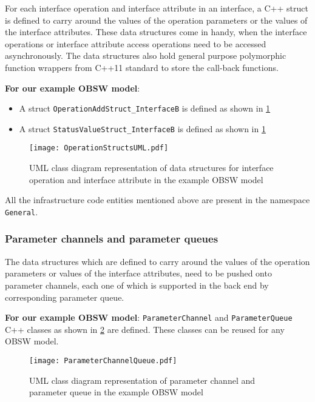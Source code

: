 For each interface operation and interface attribute in an interface, a C++ struct is defined to carry around the values of the operation parameters or the values of the interface attributes. These data structures come in handy, when the interface operations or interface attribute access operations need to be accessed asynchronously. The data structures also hold general purpose polymorphic function wrappers from C++11 standard to store the call-back functions. 

\textbf{For our example OBSW model}:
\begin{itemize}
\item A struct \texttt{OperationAdd\allowbreak Struct\_\allowbreak InterfaceB} is defined as shown in \cref{fig: Operation structs UML}
\item A struct \texttt{StatusValue\allowbreak Struct\_\allowbreak InterfaceB} is defined as shown in \cref{fig: Operation structs UML}
\end{itemize} 

\begin{figure}[h]
	\centering
	\texttt{[image: OperationStructsUML.pdf]}
	\caption{UML class diagram representation of data structures for interface operation and interface attribute in the example OBSW model}
	\label{fig: Operation structs UML}
\end{figure} 

All the infrastructure code entities mentioned above are present in the namespace \texttt{General}.

\subsubsection{\textbf{Parameter channels and parameter queues}}
The data structures which are defined to carry around the values of the operation parameters or values of the interface attributes, need to be pushed onto parameter channels, each one of which is supported in the back end by corresponding parameter queue.

\textbf{For our example OBSW model}: \texttt{Parameter\allowbreak Channel} and \texttt{Parameter\allowbreak Queue} C++ classes as shown in \cref{fig: Parameter channel UML} are defined. These classes can be reused for any OBSW model. 

\begin{figure}[h]
	\centering
	\texttt{[image: ParameterChannelQueue.pdf]}
	\caption{UML class diagram representation of parameter channel and parameter queue in the example OBSW model}
	\label{fig: Parameter channel UML}
\end{figure}

